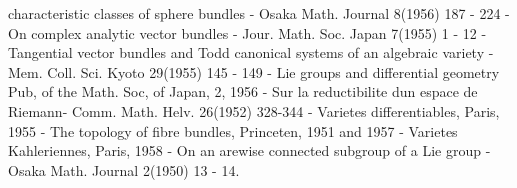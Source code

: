 \begin{thebibliography}{99}
  characteristic classes of sphere bundles - Osaka Math. Journal
  8(1956) 187 - 224 
 - On complex analytic vector bundles -
  Jour. Math. Soc. Japan 7(1955) 1 - 12 
 -  Tangential vector bundles and Todd canonical
  systems of an algebraic variety - Mem. Coll. Sci. Kyoto 29(1955)
  145 - 149 
 - Lie groups and differential geometry Pub, of
  the Math. Soc, of Japan, 2, 1956 
 - Sur la reductibilite dun espace de Riemann-
  Comm. Math. Helv. 26(1952) 328-344 
 - Varietes differentiables, Paris, 1955
 - The topology of fibre bundles, Princeten,
  1951 and 1957 
 - Varietes Kahleriennes, Paris, 1958
 - On an arewise connected subgroup of a Lie
  group - Osaka Math. Journal 2(1950) 13 - 14. 
\end{thebibliography}
